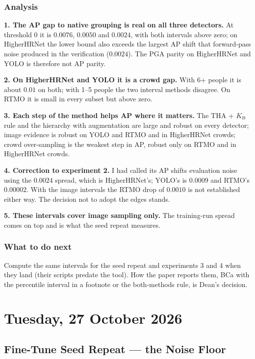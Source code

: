 \subsubsection{Analysis}

\textbf{1. The AP gap to native grouping is real on all three detectors.} At threshold 0 it is $0.0076$, $0.0050$ and $0.0024$, with both intervals above zero; on HigherHRNet the lower bound also exceeds the largest AP shift that forward-pass noise produced in the verification ($0.0024$). The PGA parity on HigherHRNet and YOLO is therefore not AP parity.

\textbf{2. On HigherHRNet and YOLO it is a crowd gap.} With 6+ people it is about $0.01$ on both; with 1--5 people the two interval methods disagree. On RTMO it is small in every subset but above zero.

\textbf{3. Each step of the method helps AP where it matters.} The THA + $K_{lb}$ rule and the hierarchy with augmentation are large and robust on every detector; image evidence is robust on YOLO and RTMO and in HigherHRNet crowds; crowd over-sampling is the weakest step in AP, robust only on RTMO and in HigherHRNet crowds.

\textbf{4. Correction to experiment 2.} I had called its AP shifts evaluation noise using the $0.0024$ spread, which is HigherHRNet's; YOLO's is $0.0009$ and RTMO's $0.00002$. With the image intervals the RTMO drop of $0.0010$ is not established either way. The decision not to adopt the edges stands.

\textbf{5. These intervals cover image sampling only.} The training-run spread comes on top and is what the seed repeat measures.

\subsubsection{What to do next}

Compute the same intervals for the seed repeat and experiments 3 and 4 when they land (their scripts predate the tool). How the paper reports them, BCa with the percentile interval in a footnote or the both-methods rule, is Dean's decision.


\section[2026/10/27]{Tuesday, 27 October 2026}

\subsection{Fine-Tune Seed Repeat --- the Noise Floor}

